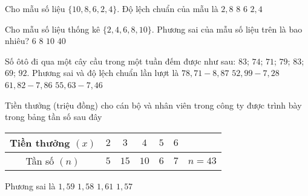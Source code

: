 \begin{ex}%
	Cho mẫu số liệu $\{10, 8, 6, 2, 4\}$. Độ lệch chuẩn của mẫu là
	\choice
	{\True $2{,}8$}
	{$8$}
	{$6$}
	{$2{,}4$}
\end{ex}

\begin{ex}%
	Cho mẫu số liệu thống kê $\{2, 4, 6, 8, 10\}$. Phương sai của mẫu số liệu trên là bao nhiêu?
	\choice
	{$6$}
	{\True $8$}
	{$10$}
	{$40$}
\end{ex}

\begin{ex}%
	Số ôtô đi qua một cây cầu trong một tuần đếm được như sau: $83$; $74$; $71$; $79$; $83$; $69$; $92$. Phương sai và độ lệch chuẩn lần lượt là
	\choice
	{$78{,}71 - 8{,}87$}
	{$52{,}99 - 7{,}28$}
	{$61{,}82 - 7{,}86$}
	{\True $55{,}63 - 7{,}46$}
\end{ex}

\begin{ex}%
	Tiền thưởng (triệu đồng) cho cán bộ và nhân viên trong công ty được trình bày trong bảng tần số sau đây
	\begin{center}
		\begin{tabular}{|c|c|c|c|c|c|c|}
			\hline
			Tiền thưởng $(x)$ & $2$ & $3$ & $4$ & $5$ & $6$ &      \\ \hline
			Tần số $(n)$    & $5$  & $15$  & $10$ & $6$ & $7$  & $n=43$ \\ \hline
		\end{tabular}
	\end{center}
	Phương sai là
	\choice
	{\True $1{,}59$}
	{$1{,}58$}
	{$1{,}61$}
	{$1{,}57$}
\end{ex}

